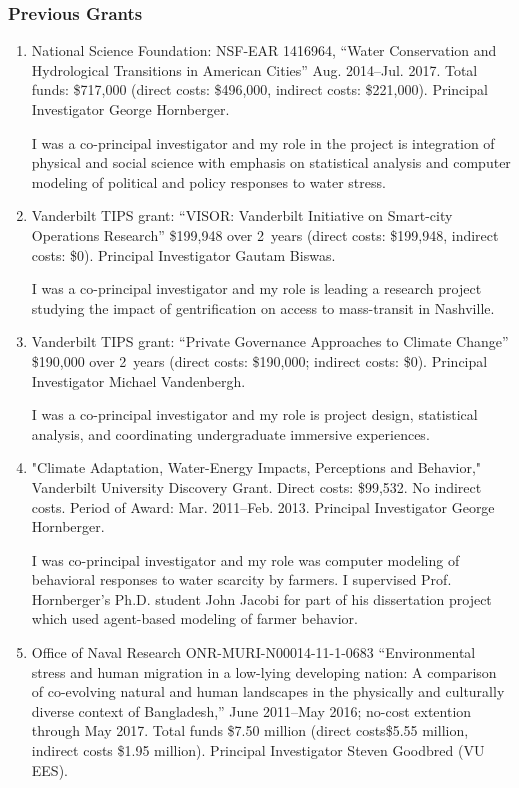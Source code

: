 \subsubsection{Previous Grants}
\begin{enumerate}
	\item National Science Foundation: NSF-EAR 1416964, ``Water Conservation and Hydrological Transitions in American Cities'' Aug. 2014--Jul. 2017. Total funds: \$717,000 (direct costs: \$496,000, indirect costs: \$221,000). Principal Investigator George Hornberger. 
	\begin{credit}
		I was a co-principal investigator and my role in the project is integration of physical and social science with emphasis on statistical analysis and computer modeling of political and policy responses to water stress.
	\end{credit}
	\item Vanderbilt TIPS grant: ``VISOR: Vanderbilt Initiative on Smart-city Operations Research'' \$199,948 over 2~years (direct costs: \$199,948, indirect costs: \$0). Principal Investigator Gautam Biswas. 
	\begin{credit}
		I was a co-principal investigator and my role is leading a research project studying the impact of gentrification on access to mass-transit in Nashville.
	\end{credit}
	\item Vanderbilt TIPS grant: ``Private Governance Approaches to Climate Change'' \$190,000 over 2~years (direct costs: \$190,000; indirect costs: \$0). Principal Investigator Michael Vandenbergh. 
	\begin{credit}
		I was a co-principal investigator and my role is project design, statistical analysis, and coordinating undergraduate immersive experiences.
	\end{credit}
	\item "Climate Adaptation, Water-Energy Impacts, Perceptions and Behavior," Vanderbilt University Discovery Grant. Direct costs: \$99,532. No indirect costs. Period of Award: Mar. 2011--Feb. 2013. Principal Investigator George Hornberger. 
	\begin{credit}
		I was co-principal investigator and my role was computer modeling of behavioral responses to water scarcity by farmers. I supervised Prof. Hornberger's Ph.D. student John Jacobi for part of his dissertation project which used agent-based modeling of farmer behavior.
	\end{credit}
	\item Office of Naval Research ONR-MURI-N00014-11-1-0683 ``Environmental stress and human migration in a low-lying developing nation: A comparison of co-evolving natural and human landscapes in the physically and culturally diverse context of Bangladesh,'' June 2011--May 2016; no-cost extention through May 2017. Total funds \$7.50 million (direct costs\$5.55 million, indirect costs \$1.95 million). Principal Investigator Steven Goodbred (VU EES). 

\end{enumerate}
